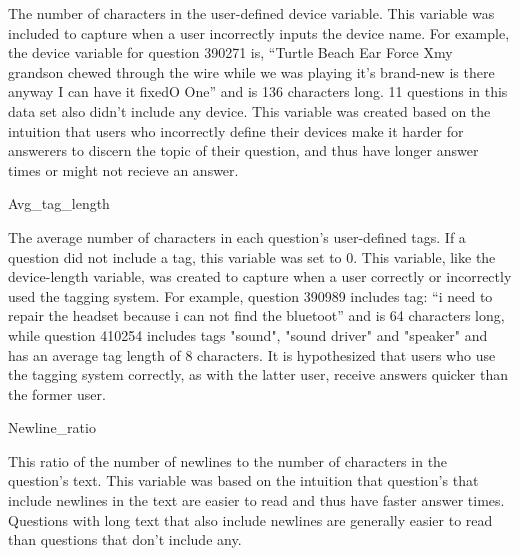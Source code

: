 \documentclass{article}
\begin{document}
The number of characters in the user-defined device variable. This variable was included to capture when a user incorrectly inputs the device name. For example, the device variable for question 390271 is, “Turtle Beach Ear Force Xmy grandson chewed through the wire while we was playing it's brand-new is there anyway I can have it fixedO One” and is 136 characters long. 11 questions in this data set also didn’t include any device. This variable was created based on the intuition that users who incorrectly define their devices make it harder for answerers to discern the topic of their question, and thus have longer answer times or might not recieve an answer.

Avg\_tag\_length

The average number of characters in each question's user-defined tags. If a question did not include a tag, this variable was set to 0. This variable, like the device-length variable, was created to capture when a user correctly or incorrectly used the tagging system. For example, question 390989 includes tag: “i need to repair the headset because i can not find the bluetoot” and is 64 characters long, while question 410254 includes tags "sound", "sound driver" and "speaker" and has an average tag length of 8 characters. It is hypothesized that users who use the tagging system correctly, as with the latter user, receive answers quicker than the former user. 

Newline\_ratio

This ratio of the number of newlines to the number of characters in the question's text. This variable was based on the intuition that question's that include newlines in the text are easier to read and thus have faster answer times. Questions with long text that also include newlines are generally easier to read than questions that don’t include any. 



\end{document}
